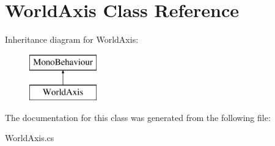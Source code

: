 \hypertarget{class_world_axis}{}\section{World\+Axis Class Reference}
\label{class_world_axis}
Inheritance diagram for World\+Axis\+:\begin{figure}[H]
\begin{center}
\leavevmode
\includegraphics[height=2.000000cm]{class_world_axis}
\end{center}
\end{figure}


The documentation for this class was generated from the following file\+:\begin{DoxyCompactItemize}
\item 
World\+Axis.\+cs\end{DoxyCompactItemize}
